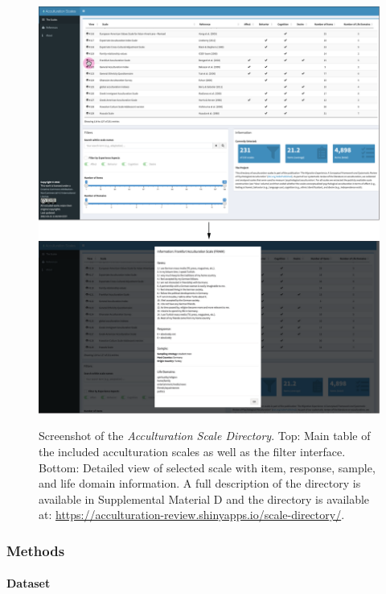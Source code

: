 \documentclass[man, 12pt, a4paper, mask]{apa7}
\begin{document}
\begin{figure}[ht!]
  \centering
  \caption{Screenshot of the \textit{Acculturation Scale Directory}. Top: Main table of the included acculturation scales as well as the filter interface. Bottom: Detailed view of selected scale with item, response, sample, and life domain information. A full description of the directory is available in Supplemental Material D and the directory is available at: \href{https://acculturation-review.shinyapps.io/scale-directory/}{https://acculturation-review.shinyapps.io/scale-directory/}.}
  \includegraphics[width=\textwidth]{Figures/AcculturationDIrectoryScreenshot.pdf}
  \label{fig:DirectoryScreen}
\end{figure}

\subsubsection{Methods}  
\paragraph{Dataset}
\end{document}
